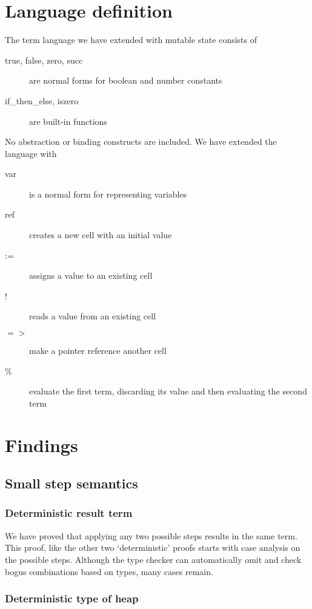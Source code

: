 \documentclass{article}
\begin{document}
\section{Language definition}\label{sec:def}

The term language we have extended with mutable state consists of
\begin{description}
\item[true, false, zero, succ] are normal forms for boolean and number constants
\item[if\_then\_else, iszero] are built-in functions
\end{description}

No abstraction or binding constructs are included.
We have extended the language with
\begin{description}
\item[var] is a normal form for representing variables
\item[ref] creates a new cell with an initial value
\item[:=] assigns a value to an existing cell
\item[!] reads a value from an existing cell
\item[$\mathbf{=>}$] make a pointer reference another cell
\item[\%] evaluate the first term, discarding its value and then evaluating the second term
\end{description}

\section{Findings}\label{sec:findings}

\subsection{Small step semantics}

\subsubsection{Deterministic result term}

We have proved that applying any two possible steps results in the
same term.  This proof, like the other two `deterministic' proofs
starts with case analysis on the possible steps. Although the type
checker can automatically omit and check bogus combinations based on
types, many cases remain.

\subsubsection{Deterministic type of heap}
\end{document}
